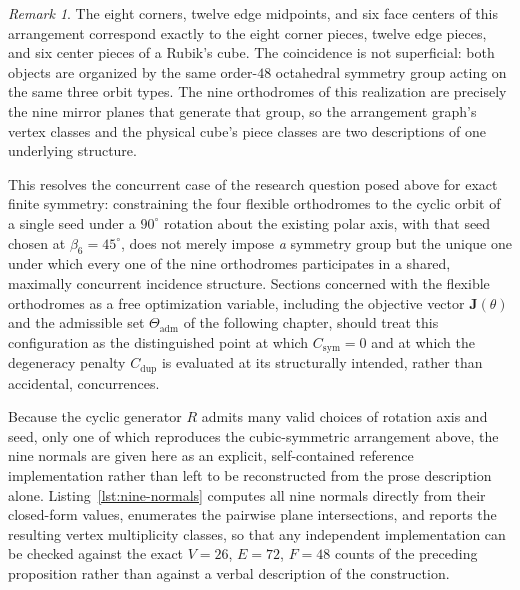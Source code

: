 \documentclass[11pt,fleqn]{book}
\numberwithin{equation}{chapter}
\theoremstyle{plain}
\theoremstyle{definition}
\theoremstyle{remark}
\newtheorem{remark}[theorem]{Remark}
\begin{document}
\begin{remark}
The eight corners, twelve edge midpoints, and six face centers of this arrangement correspond exactly to the eight corner pieces, twelve edge pieces, and six center pieces of a Rubik's cube. The coincidence is not superficial: both objects are organized by the same order-\(48\) octahedral symmetry group acting on the same three orbit types. The nine orthodromes of this realization are precisely the nine mirror planes that generate that group, so the arrangement graph's vertex classes and the physical cube's piece classes are two descriptions of one underlying structure.
\end{remark}

This resolves the concurrent case of the research question posed above for exact finite symmetry: constraining the four flexible orthodromes to the cyclic orbit of a single seed under a \(90^\circ\) rotation about the existing polar axis, with that seed chosen at \(\beta_6=45^\circ\), does not merely impose \emph{a} symmetry group but the unique one under which every one of the nine orthodromes participates in a shared, maximally concurrent incidence structure. Sections concerned with the flexible orthodromes as a free optimization variable, including the objective vector \(\mathbf J(\theta)\) and the admissible set \(\Theta_{\mathrm{adm}}\) of the following chapter, should treat this configuration as the distinguished point at which \(C_{\mathrm{sym}}=0\) and at which the degeneracy penalty \(C_{\mathrm{dup}}\) is evaluated at its structurally intended, rather than accidental, concurrences.

Because the cyclic generator \(R\) admits many valid choices of rotation axis and seed, only one of which reproduces the cubic-symmetric arrangement above, the nine normals are given here as an explicit, self-contained reference implementation rather than left to be reconstructed from the prose description alone. Listing~\ref{lst:nine-normals} computes all nine normals directly from their closed-form values, enumerates the pairwise plane intersections, and reports the resulting vertex multiplicity classes, so that any independent implementation can be checked against the exact \(V=26\), \(E=72\), \(F=48\) counts of the preceding proposition rather than against a verbal description of the construction.
\end{document}
